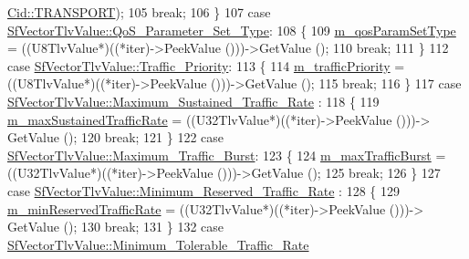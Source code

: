 \begin{DoxyCode}
      \hyperlink{classns3_1_1Cid_a10b8f92080ca5790e65a0bfa2f557e0aa46fbed56841c3bf471aa84de022edf87}{Cid::TRANSPORT});
105             \textcolor{keywordflow}{break};
106           \}
107         \textcolor{keywordflow}{case} \hyperlink{classns3_1_1SfVectorTlvValue_aa23ab5c7acfce609dbfe28024c6d2ef7a693fa7df3607cf9155c9abf5cc6a7b44}{SfVectorTlvValue::QoS\_Parameter\_Set\_Type}:
108           \{
109             \hyperlink{classns3_1_1ServiceFlow_a76222bd599cc4e27578bafba5304d158}{m\_qosParamSetType} = ((U8TlvValue*)((*iter)->PeekValue ()))->GetValue ();
110             \textcolor{keywordflow}{break};
111           \}
112         \textcolor{keywordflow}{case} \hyperlink{classns3_1_1SfVectorTlvValue_aa23ab5c7acfce609dbfe28024c6d2ef7a6b1fd6e9e6137e7f5cc0ce1b37d83c31}{SfVectorTlvValue::Traffic\_Priority}:
113           \{
114             \hyperlink{classns3_1_1ServiceFlow_a536ed647361dd0cc432aec5b4a6d661a}{m\_trafficPriority} = ((U8TlvValue*)((*iter)->PeekValue ()))->GetValue ();
115             \textcolor{keywordflow}{break};
116           \}
117         \textcolor{keywordflow}{case} \hyperlink{classns3_1_1SfVectorTlvValue_aa23ab5c7acfce609dbfe28024c6d2ef7a125581295735fe211fb06da69d9f8284}{SfVectorTlvValue::Maximum\_Sustained\_Traffic\_Rate}
      :
118           \{
119             \hyperlink{classns3_1_1ServiceFlow_a604d5dcda6dbb58528799cf439584ecb}{m\_maxSustainedTrafficRate} = ((U32TlvValue*)((*iter)->PeekValue ()))->
      GetValue ();
120             \textcolor{keywordflow}{break};
121           \}
122         \textcolor{keywordflow}{case} \hyperlink{classns3_1_1SfVectorTlvValue_aa23ab5c7acfce609dbfe28024c6d2ef7a78828bb106e51ec31cd7e4f425aae174}{SfVectorTlvValue::Maximum\_Traffic\_Burst}:
123           \{
124             \hyperlink{classns3_1_1ServiceFlow_a6d99ed08420605f4f56188eced87ccd0}{m\_maxTrafficBurst} = ((U32TlvValue*)((*iter)->PeekValue ()))->GetValue ();
125             \textcolor{keywordflow}{break};
126           \}
127         \textcolor{keywordflow}{case} \hyperlink{classns3_1_1SfVectorTlvValue_aa23ab5c7acfce609dbfe28024c6d2ef7aa60ff8e299d3229b5a9146a4a679d7f0}{SfVectorTlvValue::Minimum\_Reserved\_Traffic\_Rate}
      :
128           \{
129             \hyperlink{classns3_1_1ServiceFlow_a54dc771349ed7d93631e4a44299838d7}{m\_minReservedTrafficRate} = ((U32TlvValue*)((*iter)->PeekValue ()))->
      GetValue ();
130             \textcolor{keywordflow}{break};
131           \}
132         \textcolor{keywordflow}{case} \hyperlink{classns3_1_1SfVectorTlvValue_aa23ab5c7acfce609dbfe28024c6d2ef7ac2e29e96a1d01a1eaca1f4ea28919b62}{SfVectorTlvValue::Minimum\_Tolerable\_Traffic\_Rate}

\end{DoxyCode}

